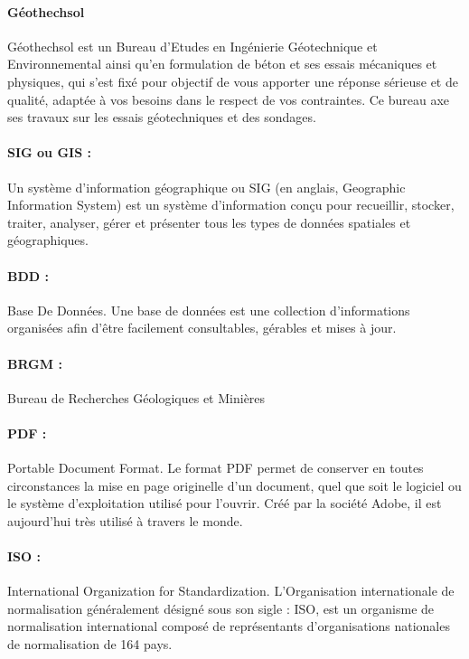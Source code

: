 \paragraph{Géothechsol}
Géothechsol est un Bureau d’Etudes 
en Ingénierie Géotechni\-que et Environnemental
ainsi qu’en formulation de béton et ses essais mécani\-ques et physiques, qui s’est
fixé pour objectif de vous apporter une réponse sérieuse et de qualité, adaptée à 
vos besoins dans le respect de vos contraintes. Ce bureau axe ses travaux sur les
essais géotechniques et des sondages.

\paragraph{SIG ou GIS :}  
Un système d'information géographique ou SIG (en anglais, Geographic 
Information System) est un système d'information conçu pour 
recueillir, stocker, traiter, analyser, gérer et présenter tous les 
types de données spatiales et géographiques. 

\paragraph{BDD :} 
Base De Données. Une base de données  est une collection d’informations organisées afin 
d’être facilement consultables, gérables et mises à jour.

\paragraph{BRGM :}
Bureau de Recherches Géologiques et Minières


\paragraph{PDF :}
Portable Document Format. Le format PDF permet de conserver en 
toutes circonstances la mise en page 
originelle d'un document, quel que soit le logiciel ou le système 
d'exploitation utilisé pour l'ouvrir. Créé par la société Adobe, 
il est aujourd'hui très utilisé à travers le monde.

\paragraph{ISO :}
International Organization for Standardization.
L'Organisation internationale de normalisation généralement désigné sous son
 sigle : ISO, est un organisme de normalisation international composé de 
 représentants d'organisations nationales de normalisation de 164 pays.


